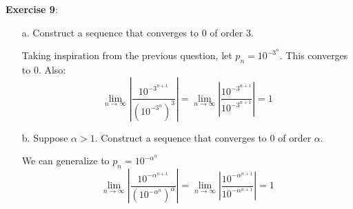\documentclass{article}
\begin{document}
\textbf{Exercise 9}: 
    \begin{itemize}
        \item [a.] Construct a sequence that converges to $0$ of order $3$.
            \begin{answer}
                Taking inspiration from the previous question, let $p_{n} = 10^{-3^{n}}$. This converges to $0$. Also:
                    \begin{equation*}
                        \lim\limits_{n \to \infty} \left\lvert \dfrac{10^{-3^{n + 1}}}{(10^{-3^{n}})^{3}} \right\rvert = \lim\limits_{n \to \infty} \left\lvert \dfrac{10^{-3^{n + 1}}}{10^{-3^{n + 1}}} \right\rvert = 1
                    \end{equation*}
                    
            \end{answer}

        \item [b.] Suppose $\alpha > 1$. Construct a sequence that converges to $0$ of order $\alpha$.
            \begin{answer}
                We can generalize to $p_{n} = 10^{-\alpha^{n}}$
                    \begin{equation*}
                        \lim\limits_{n \to \infty} \left\lvert \dfrac{10^{-\alpha^{n + 1}}}{(10^{-\alpha^{n}})^{\alpha}} \right\rvert = \lim\limits_{n \to \infty} \left\lvert \dfrac{10^{-\alpha^{n + 1}}}{10^{-\alpha^{n + 1}}} \right\rvert = 1
                    \end{equation*}
            \end{answer}
    \end{itemize}
\end{document}

